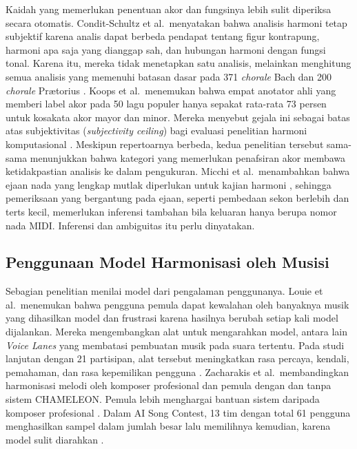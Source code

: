 Kaidah yang memerlukan penentuan akor dan fungsinya lebih sulit diperiksa secara otomatis. Condit-Schultz et al.\ menyatakan bahwa analisis harmoni tetap subjektif karena analis dapat berbeda pendapat tentang figur kontrapung, harmoni apa saja yang dianggap sah, dan hubungan harmoni dengan fungsi tonal. Karena itu, mereka tidak menetapkan satu analisis, melainkan menghitung semua analisis yang memenuhi batasan dasar pada 371 \textit{chorale} Bach dan 200 \textit{chorale} Prætorius \parencite[66]{conditschultz2018}. Koops et al.\ menemukan bahwa empat anotator ahli yang memberi label akor pada 50 lagu populer hanya sepakat rata-rata 73 persen untuk kosakata akor mayor dan minor. Mereka menyebut gejala ini sebagai batas atas subjektivitas (\textit{subjectivity ceiling}) bagi evaluasi penelitian harmoni komputasional \parencite{koops2019}. Meskipun repertoarnya berbeda, kedua penelitian tersebut sama-sama menunjukkan bahwa kategori yang memerlukan penafsiran akor membawa ketidakpastian analisis ke dalam pengukuran. Micchi et al.\ menambahkan bahwa ejaan nada yang lengkap mutlak diperlukan untuk kajian harmoni \parencite{micchi2020}, sehingga pemeriksaan yang bergantung pada ejaan, seperti pembedaan sekon berlebih dan terts kecil, memerlukan inferensi tambahan bila keluaran hanya berupa nomor nada MIDI. Inferensi dan ambiguitas itu perlu dinyatakan.

\subsection{Penggunaan Model Harmonisasi oleh Musisi}\label{sec:evaluasi-penggunaan-model}

Sebagian penelitian menilai model dari pengalaman penggunanya. Louie et al.\ menemukan bahwa pengguna pemula dapat kewalahan oleh banyaknya musik yang dihasilkan model dan frustrasi karena hasilnya berubah setiap kali model dijalankan. Mereka mengembangkan alat untuk mengarahkan model, antara lain \textit{Voice Lanes} yang membatasi pembuatan musik pada suara tertentu. Pada studi lanjutan dengan 21 partisipan, alat tersebut meningkatkan rasa percaya, kendali, pemahaman, dan rasa kepemilikan pengguna \parencite{louie2020}. Zacharakis et al.\ membandingkan harmonisasi melodi oleh komposer profesional dan pemula dengan dan tanpa sistem CHAMELEON. Pemula lebih menghargai bantuan sistem daripada komposer profesional \parencite{zacharakis2021}. Dalam AI Song Contest, 13 tim dengan total 61 pengguna menghasilkan sampel dalam jumlah besar lalu memilihnya kemudian, karena model sulit diarahkan \parencite{huang2020contest}.

